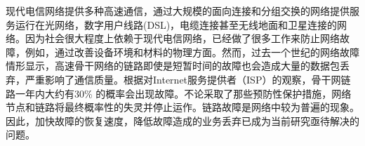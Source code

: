 %
%

现代电信网络提供多种高速通信，通过大规模的面向连接和分组交换的网络提供服务运行在光网络，数字用户线路(DSL)，电缆连接甚至无线地面和卫星连接的网络。因为社会很大程度上依赖于现代电信网络，已经做了很多工作来防止网络故障，例如，通过改善设备环境和材料的物理方面。然而，过去一个世纪的网络故障情形显示，高速骨干网络的链路即使是短暂时间的故障也会造成大量的数据包丢弃\cite{dittmann2002network}，严重影响了通信质量。根据对Internet服务提供者（ISP）的观察，骨干网链路一年内大约有30\% 的概率会出现故障\cite{doerr2014all}。不论采取了那些预防性保护措施，网络节点和链路将最终概率性的失灵并停止运作。链路故障是网络中较为普遍的现象。因此，加快故障的恢复速度，降低故障造成的业务丢弃已成为当前研究亟待解决的问题。


